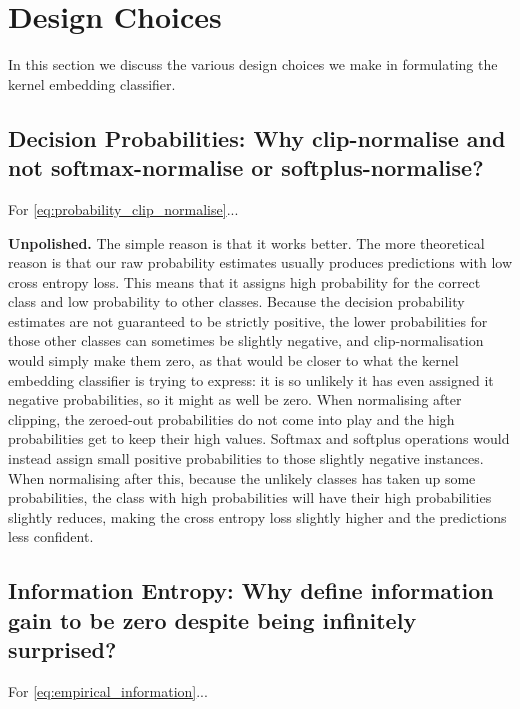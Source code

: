 \documentclass{article}
\newcommand{\note}[1]{{\color{orange} #1}}
\begin{document}
\section{Design Choices}
\label{app:design_choices}

	In this section we discuss the various design choices we make in formulating the kernel embedding classifier.

	\subsection{Decision Probabilities: Why clip-normalise and not softmax-normalise or softplus-normalise?}
	
		For \eqref{eq:probability_clip_normalise}...
		
		\note{\textbf{Unpolished.}} The simple reason is that it works better. The more theoretical reason is that our raw probability estimates usually produces predictions with low cross entropy loss. This means that it assigns high probability for the correct class and low probability to other classes. Because the decision probability estimates are not guaranteed to be strictly positive, the lower probabilities for those other classes can sometimes be slightly negative, and clip-normalisation would simply make them zero, as that would be closer to what the kernel embedding classifier is trying to express: it is so unlikely it has even assigned it negative probabilities, so it might as well be zero. When normalising after clipping, the zeroed-out probabilities do not come into play and the high probabilities get to keep their high values. Softmax and softplus operations would instead assign small positive probabilities to those slightly negative instances. When normalising after this, because the unlikely classes has taken up some probabilities, the class with high probabilities will have their high probabilities slightly reduces, making the cross entropy loss slightly higher and the predictions less confident.
		
	\subsection{Information Entropy: Why define information gain to be zero despite being infinitely surprised?}
	
		For \eqref{eq:empirical_information}...
		
\end{document}
